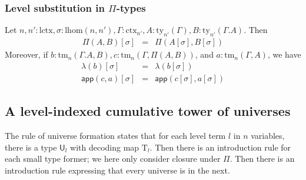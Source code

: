 \documentclass[11pt,a4paper]{article}
\theoremstyle{definition}
\newcommand{\UU}{\mathsf{U}}
\newcommand{\app}[2]{{#1\,#2}} %
\def\lhom{\mathrm{lhom}}
\def\UU{\mathsf{U}}
\def\lctx{\mathrm{lctx}}
\newcommand{\ctx}{\mathrm{ctx}}
\newcommand{\ty}{\mathrm{ty}}
\newcommand{\tm}{\mathrm{tm}}
\def\app{\mathsf{app}}
\newcommand{\Ta}{\mathrm{T}}
\begin{document}


\subsubsection{Level substitution in $\Pi$-types}

Let $n, n' : \lctx , \sigma : \lhom(n,n'), \Gamma : \ctx_{n'}, A:\ty_{n'}(\Gamma), B:\ty_{n'}(\Gamma.A)$. Then
\begin{eqnarray*}
\Pi(A,B)[\sigma] &=& \Pi(A[\sigma],B[\sigma])
\end{eqnarray*}
Moreover, if $b : \tm_n(\Gamma.A,B), c :  \tm_n(\Gamma,\Pi(A,B))$,  and $a : \tm_n(\Gamma,A)$, we have
\begin{eqnarray*}
\lambda(b)[\sigma] &=&\lambda(b[\sigma])\\
\app(c,a)[\sigma] &=&\app(c[\sigma],a[\sigma])
\end{eqnarray*}

\subsection{A level-indexed cumulative tower of universes}

The rule of universe formation states that for each level term $l$ in $n$ variables, there is a type $\UU_l$ with decoding map $\Ta_l$. Then there is an introduction rule for each small type former; we here only consider closure under $\Pi$. Then there is an introduction rule expressing that every universe is in the next. 
\end{document}
